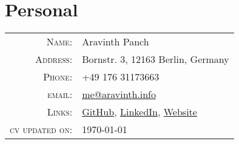 \section{Personal}
\begin{tabular}
	{rl}
	\textsc{Name:} &  Aravinth Panch \\
	\textsc{Address:} & Bornstr. 3, 12163 Berlin, Germany\\
	\textsc{Phone:} & +49 176 31173663\\
	\textsc{email:} & \href{mailto:me@aravinth.info}{me@aravinth.info} \\
	\textsc{Links:} & \href{https://github.com/AravinthPanch}{GitHub}, \href{https://www.linkedin.com/in/aravinthpanch/}{LinkedIn}, \href{https://aravinth.info}{Website} \\
	\textsc{cv updated on:} & \today\\
\end{tabular}
